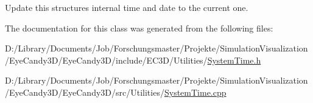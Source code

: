 Update this structures internal time and date to the current one. 



The documentation for this class was generated from the following files\+:\begin{DoxyCompactItemize}
\item 
D\+:/\+Library/\+Documents/\+Job/\+Forschungsmaster/\+Projekte/\+Simulation\+Visualization/\+Eye\+Candy3\+D/\+Eye\+Candy3\+D/include/\+E\+C3\+D/\+Utilities/\mbox{\hyperlink{_system_time_8h}{System\+Time.\+h}}\item 
D\+:/\+Library/\+Documents/\+Job/\+Forschungsmaster/\+Projekte/\+Simulation\+Visualization/\+Eye\+Candy3\+D/\+Eye\+Candy3\+D/src/\+Utilities/\mbox{\hyperlink{_system_time_8cpp}{System\+Time.\+cpp}}\end{DoxyCompactItemize}
